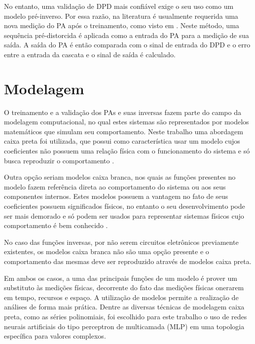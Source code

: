 No entanto, uma validação de DPD mais confiável exige o seu uso como um modelo pré-inverso. Por essa razão, na literatura é usualmente requerida uma nova medição do PA após o treinamento, como visto em \cite{8891388}. Neste método, uma sequência pré-distorcida é aplicada como a entrada do PA para a medição de sua saída. A saída do PA é então comparada com o sinal de entrada do DPD e o erro entre a entrada da cascata e o sinal de saída é calculado.

\section{Modelagem} \label{sec:fundteo-model}
O treinamento e a validação dos PAs e suas inversas fazem parte do campo da modelagem computacional, no qual estes sistemas são representados por modelos matemáticos que simulam seu comportamento. Neste trabalho uma abordagem caixa preta foi utilizada, que possui como característica usar um modelo cujos coeficientes não possuem uma relação física com o funcionamento do sistema e só busca reproduzir o comportamento \cite{8882211}.

Outra opção seriam modelos caixa branca, nos quais as funções presentes no modelo fazem referência direta ao comportamento do sistema ou aos seus componentes internos. Estes modelos possuem a vantagem no fato de seus coeficientes possuem significados físicos, no entanto o seu desenvolvimento pode ser mais demorado e só podem ser usados para representar sistemas físicos cujo comportamento é bem conhecido \cite{8882211}.

No caso das funções inversas, por não serem circuitos eletrônicos previamente existentes, os modelos caixa branca não são uma opção presente e o comportamento das mesmas deve ser reproduzido através de modelos caixa preta.

Em ambos os casos, a uma das principais funções de um modelo é prover um substituto às medições físicas, decorrente do fato das medições físicas onerarem em tempo, recursos e espaço. A utilização de modelos permite a realização de análises de forma mais prática.
Dentre as diversas técnicas de modelagem caixa preta, como as séries polinomiais, foi escolhido para este trabalho o uso de redes neurais artificiais do tipo perceptron de multicamada (MLP) em uma topologia específica para valores complexos.

